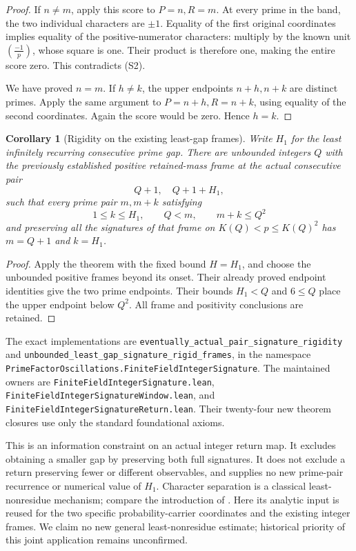 \documentclass[11pt]{article}
\newtheorem{corollary}[theorem]{Corollary}
\begin{document}
\begin{proof}
If \(n\ne m\), apply this score to \(P=n,R=m\).
At every prime in the band, the two individual characters are
\(\pm1\).  Equality of the first original coordinates implies equality
of the positive-numerator characters: multiply by the known unit
\(\left(\frac{-1}{p}\right)\), whose square is one.
Their product is therefore one, making the entire score zero.
This contradicts (S2).

We have proved \(n=m\).  If \(h\ne k\), the upper endpoints
\(n+h,n+k\) are distinct primes.  Apply the same argument to
\(P=n+h,R=n+k\), using equality of the second coordinates.
Again the score would be zero.  Hence \(h=k\).
\end{proof}

\begin{corollary}[Rigidity on the existing least-gap frames]
\label{cor:least-gap-signature-return}
Write \(H_1\) for the least infinitely recurring consecutive prime gap.
There are unbounded integers \(Q\) with the previously established
positive retained-mass frame at the actual consecutive pair
\[
                  Q+1,\quad Q+1+H_1,
\]
such that every prime pair \(m,m+k\) satisfying
\[
 1\le k\le H_1,\qquad Q<m,\qquad m+k\le Q^2
\]
and preserving all the signatures of that frame on
\(K(Q)<p\le K(Q)^2\) has \(m=Q+1\) and \(k=H_1\).
\end{corollary}
\begin{proof}
Apply the theorem with the fixed bound \(H=H_1\), and choose the
unbounded positive frames beyond its onset.  Their already proved
endpoint identities give the two prime endpoints.  Their bounds
\(H_1<Q\) and \(6\le Q\) place the upper endpoint below \(Q^2\).
All frame and positivity conclusions are retained.
\end{proof}

The exact implementations are
\texttt{eventually\_actual\_pair\_signature\_rigidity} and
\texttt{unbounded\_least\_gap\_signature\_rigid\_frames}, in the
namespace \texttt{PrimeFactorOscillations.FiniteFieldIntegerSignature}.
The maintained owners are \texttt{FiniteFieldIntegerSignature.lean},
\texttt{FiniteFieldIntegerSignatureWindow.lean}, and
\texttt{FiniteFieldIntegerSignatureReturn.lean}.  Their twenty-four
new theorem closures use only the standard foundational axioms.

This is an information constraint on an actual integer return map.
It excludes obtaining a smaller gap by preserving both full signatures.
It does not exclude a return preserving fewer or different observables,
and supplies no new prime-pair recurrence or numerical value of \(H_1\).
Character separation is a classical least-nonresidue mechanism; compare
the introduction of \cite{LauWuLeastNonresidue}.
Here its analytic input is reused for the two specific probability-carrier
coordinates and the existing integer frames.  We claim no new general
least-nonresidue estimate; historical priority of this joint application
remains unconfirmed.
\end{document}
